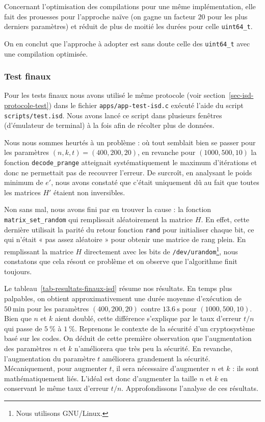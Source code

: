 \documentclass[11pt,a4paper]{article}
\begin{document}
Concernant l'optimisation des compilations pour une même implémentation, elle
fait des prouesses pour l'approche naïve (on gagne un facteur $20$ pour les plus
derniers paramètres) et réduit de plus de moitié les durées pour celle
\texttt{uint64\_t}.

On en conclut que l'approche à adopter est sans doute celle des
\texttt{uint64\_t} avec une compilation optimisée.

\subsubsection{Test finaux}
\label{sec-isd-tests-finaux}

Pour les tests finaux nous avons utilisé le même protocole (voir
section~\ref{sec-isd-protocole-test}) dans le fichier
\texttt{apps/app-test-isd.c} exécuté l'aide du script \texttt{scripts/test.isd}.
Nous avons lancé ce script dans plusieurs fenêtres (d'émulateur de terminal) à
la fois afin de récolter plus de données.

Nous nous sommes heurtés à un problème : où tout semblait bien se passer pour les
paramètres $(n,k,t) = (400,200,20)$, en revanche pour $(1000, 500, 10)$ la
fonction \texttt{decode\_prange} atteignait systématiquement le maximum
d'itérations et donc ne permettait pas de recouvrer l'erreur.
De surcroît, en analysant le poids minimum de $e'$, nous avons constaté que
c'était uniquement dû au fait que toutes les matrices $H'$ étaient non
inversibles.

Non sans mal, nous avons fini par en trouver la cause : la fonction
\texttt{matrix\_set\_random} qui remplissait aléatoirement la matrice $H$.
En effet, cette dernière utilisait la parité du retour fonction \texttt{rand}
pour initialiser chaque bit, ce qui n'était « pas assez aléatoire » pour obtenir
une matrice de rang plein.
En remplissant la matrice $H$ directement avec les bits de
\texttt{/dev/urandom}\footnote{Nous utilisons GNU/Linux.}, nous constatons que
cela résout ce problème et on observe que l'algorithme finit toujours.

Le tableau~\ref{tab-resultats-finaux-isd} résume nos résultats.
En temps plus palpables, on obtient approximativement une durée moyenne
d'exécution de $\qty[round-mode=none]{50}{\minute}$ pour les paramètres $(400,200,20)$ contre
$\qty[round-mode=none]{13.6}{\second}$ pour $(1000,500,10)$.
Bien que $n$ et $k$ aient doublé, cette différence s'explique par le taux d'erreur
$t/n$ qui passe de $\qty[round-mode=none]{5}{\percent}$ à
$\qty[round-mode=none]{1}{\percent}$.
Reprenons le contexte de  la sécurité d'un cryptosystème basé sur les codes. On
déduit de cette première observation que l'augmentation des paramètres $n$ et
$k$ n'améliorera que très peu la sécurité. En revanche, l'augmentation du paramètre
$t$ améliorera grandement la sécurité.
Mécaniquement, pour augmenter $t$, il sera nécessaire d'augmenter $n$ et $k$ :
ils sont mathématiquement liés. L'idéal est donc d'augmenter la taille $n$ et
$k$ en conservant le même taux d'erreur $t/n$.
Approfondissons l'analyse de ces résultats.
\end{document}
